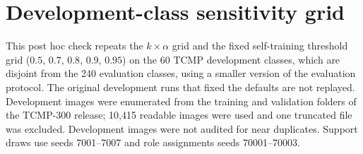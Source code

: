 \FloatBarrier
\section{Development-class sensitivity grid}\label{sec:s-dev}
This post hoc check repeats the $k\times\alpha$ grid and the fixed self-training threshold grid ($0.5$, $0.7$, $0.8$, $0.9$, $0.95$) on the 60 TCMP development classes, which are disjoint from the 240 evaluation classes, using a smaller version of the evaluation protocol. The original development runs that fixed the defaults are not replayed. Development images were enumerated from the training and validation folders of the TCMP-300 release; 10,415 readable images were used and one truncated file was excluded. Development images were not audited for near duplicates. Support draws use seeds 7001--7007 and role assignments seeds 70001--70003.

\begin{table}[!htbp]\centering\small
\caption{Repeating the grid on the 60 TCMP development classes (30 known / 20 pool-unknown / 10 query-only per role, 3 roles, 7 support draws). Known accuracy (\%). The selection criterion averaged the three four-shot conditions: best LP $k=5$, $\alpha=0.99$, best fixed threshold 0.95.}\label{tab:s-dev}
\ifdim\wd\tablebox>\linewidth\resizebox{\linewidth}{!}{\usebox{\tablebox}}\else\usebox{\tablebox}\fi
\end{table}

